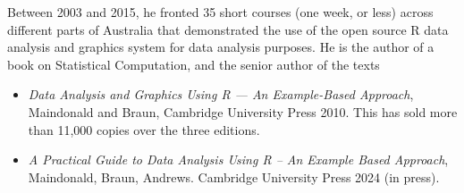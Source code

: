 \documentclass[
  10pt,
  b5paper]{book}
\providecommand{\tightlist}{%
  \setlength{\itemsep}{0pt}\setlength{\parskip}{0pt}}
\begin{document}
Between 2003 and 2015, he fronted 35 short courses (one week, or less)
across different parts of Australia that demonstrated the use of the open source R data analysis and graphics system for data analysis purposes.
He is the author of a book on Statistical Computation, and the senior author of
the texts

\begin{itemize}
\tightlist
\item
  \emph{Data Analysis and Graphics Using R --- An Example-Based Approach}, Maindonald and Braun, Cambridge University Press 2010.
  This has sold more than 11,000 copies over the three editions.\\
\item
  \emph{A Practical Guide to Data Analysis Using R -- An Example Based Approach},
  Maindonald, Braun, Andrews. Cambridge University Press 2024 (in press).
\end{itemize}
\end{document}
